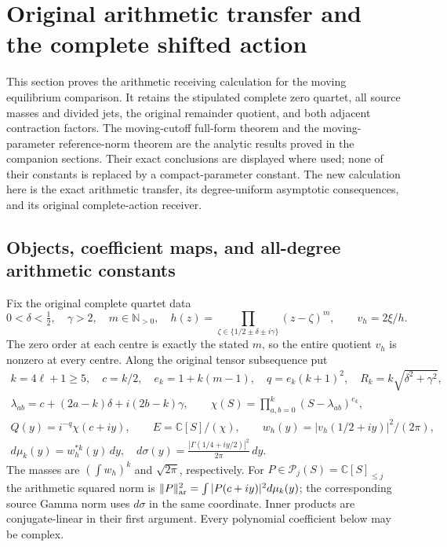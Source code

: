 \documentclass[11pt,a4paper]{article}
\begin{document}
\clearpage
\label{MTBUILD:GRA_COMPLETE_PREREQUISITE:start}
\clearpage
\label{GRBUILD:ARITHMETIC_GROWING_RATIO_BODY:start}
\section{Original arithmetic transfer and the complete shifted action}
\label{gra:section}

This section proves the arithmetic receiving calculation for the moving
equilibrium comparison.  It retains the stipulated complete zero quartet,
all source masses and divided jets, the original remainder quotient, and
both adjacent contraction factors.  The moving-cutoff full-form theorem
and the moving-parameter reference-norm theorem are the analytic results
proved in the companion sections.  Their exact conclusions are displayed
where used; none of their constants is replaced by a compact-parameter
constant.  The new calculation here is the exact arithmetic transfer,
its degree-uniform asymptotic consequences, and its original complete-action
receiver.

\subsection{Objects, coefficient maps, and all-degree arithmetic constants}

Fix the original complete quartet data
\[
 0<\delta<\tfrac12,\quad \gamma>2,\quad m\in\mathbb N_{>0},\quad
 h(z)=\prod_{\zeta\in\{1/2\pm\delta\pm i\gamma\}}(z-\zeta)^m,
 \qquad v_h=2\xi/h.
\]
The zero order at each centre is exactly the stated $m$, so the entire
quotient $v_h$ is nonzero at every centre.  Along the original tensor
subsequence put
\begin{equation}
 \begin{gathered}
 k=4\ell+1\ge5,\quad c=k/2,\quad e_k=1+k(m-1),\quad
 q=e_k(k+1)^2,\quad R_k=k\sqrt{\delta^2+\gamma^2},\\
 \lambda_{ab}=c+(2a-k)\delta+i(2b-k)\gamma,\qquad
 \chi(S)=\prod_{a,b=0}^k(S-\lambda_{ab})^{e_k},\\
 Q(y)=i^{-q}\chi(c+iy),\qquad E=\mathbb C[S]/(\chi),\qquad
 w_h(y)=|v_h(1/2+iy)|^2/(2\pi),\\
 d\mu_k(y)=w_h^{*k}(y)\,dy,\quad
 d\sigma(y)=\frac{|\Gamma(1/4+iy/2)|^2}{2\pi}\,dy.
 \end{gathered}\tag{GRA1}\label{gra:objects}
\end{equation}
The masses are $(\int w_h)^k$ and $\sqrt{2\pi}$, respectively.  For
$P\in\mathcal P_j(S)=\mathbb C[S]_{\le j}$ the arithmetic squared norm is
$\|P\|_{\rm ar}^2=\int|P(c+iy)|^2d\mu_k(y)$; the corresponding source
Gamma norm uses $d\sigma$ in the same coordinate.  Inner products are
conjugate-linear in their first argument.  Every polynomial coefficient
below may be complex.
\end{document}
